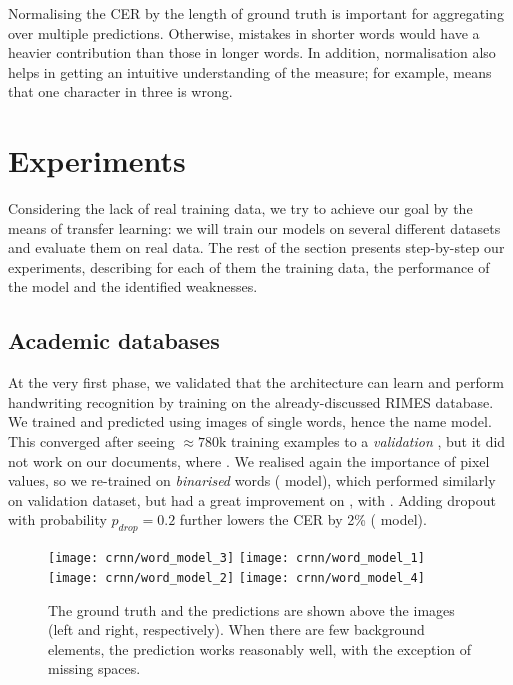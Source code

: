 			Normalising the CER by the length of ground truth is important for aggregating over multiple predictions. Otherwise, mistakes in shorter words would have a heavier contribution than those in longer words. In addition, normalisation also helps in getting an intuitive understanding of the measure; for example,  means that one character in three is wrong.



\section{Experiments}\label{sec:transcription_experiments}
	Considering the lack of real training data, we try to achieve our goal by the means of transfer learning: we will train our models on several different datasets and evaluate them on real data. The rest of the section presents step-by-step our experiments, describing for each of them the training data, the performance of the model and the identified weaknesses.


	\subsection{Academic databases}
		At the very first phase, we validated that the architecture can learn and perform handwriting recognition by training on the already-discussed RIMES database. We trained and predicted using images of single words, hence the name  model. This converged after seeing \(\approx 780\)k training examples to a \emph{validation} ,	but it did not work on our documents, where . We realised again the importance of pixel values, so we re-trained on \emph{binarised} words ( model), which performed similarly on validation dataset, but had a great improvement on , with . Adding dropout with probability \(p_\mathit{drop} = 0.2\) further lowers the CER by 2\% ( model).

		\begin{figure}
			\texttt{[image: crnn/word\_model\_3]}
			\texttt{[image: crnn/word\_model\_1]}
			\texttt{[image: crnn/word\_model\_2]}
			\texttt{[image: crnn/word\_model\_4]}
			\caption[Predictions of  model]{The ground truth and the predictions are shown above the images (left and right, respectively). When there are few background elements, the prediction works reasonably well, with the exception of missing spaces.}
			\label{fig:crnn_word_drop_model}
		\end{figure}

